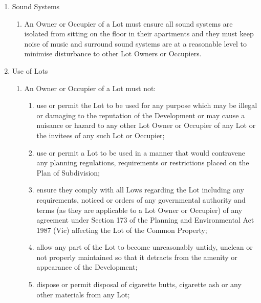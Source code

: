 \documentclass{article}
\begin{document}
\begin{enumerate}[label=\arabic*.]
\begin{enumerate}[label=\arabic{enumi}.\arabic*.]
\begin{enumerate}[label=\arabic{enumi}.\arabic*.]
\begin{enumerate}[label=(\arabic*)]
\end{enumerate}

\item  Sound Systems

\begin{enumerate}[label=(\arabic*)]

\item  An Owner or Occupier of a Lot must ensure all sound systems are isolated from sitting on the floor in their apartments and they must keep noise of music and surround sound systems are at a reasonable level to minimise disturbance to other Lot Owners or Occupiers.

\end{enumerate}

\item  Use of Lots

\begin{enumerate}[label=(\arabic*)]

\item  An Owner or Occupier of a Lot must not:

\begin{enumerate}[label=(\alph*)]

\item  use or permit the Lot to be used for any purpose which may be illegal or damaging to the reputation of the Development or may cause a nuisance or hazard to any other Lot Owner or Occupier of any Lot or the invitees of any such Lot or Occupier;

\item  use or permit a Lot to be used in a manner that would contravene any planning regulations, requirements or restrictions placed on the Plan of Subdivision;

\item  ensure they comply with all Lows regarding the Lot including any requirements, noticed or orders of any governmental authority and terms (as they are applicable to a Lot Owner or Occupier) of any agreement under Section 173 of the Planning and Environmental Act 1987 (Vic) affecting the Lot of the Common Property;

\item  allow any part of the Lot to become unreasonably untidy, unclean or not properly maintained so that it detracts from the amenity or appearance of the Development;

\item  dispose or permit disposal of cigarette butts, cigarette ash or any other materials from any Lot;


\end{enumerate}
\end{enumerate}
\end{enumerate}
\end{enumerate}
\end{enumerate}
\end{document}

